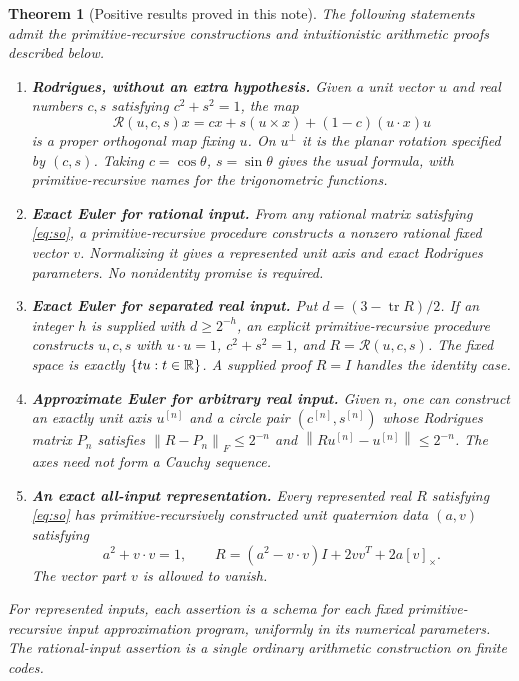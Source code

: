 \documentclass[11pt]{article}
\newtheorem{theorem}{Theorem}[section]
\theoremstyle{definition}\newtheorem{definition}[theorem]{Definition}
\newcommand{\tr}{\operatorname{tr}}\newcommand{\adj}{\operatorname{adj}}
\newcommand{\norm}[1]{\left\lVert#1\right\rVert}
\newcommand{\crossmat}[1]{[#1]_{\times}}
\begin{document}
\begin{theorem}[Positive results proved in this note]\label{thm:results}
The following statements admit the primitive-recursive constructions and
intuitionistic arithmetic proofs described below.
\begin{enumerate}[label=(\roman*)]
\item \textbf{Rodrigues, without an extra hypothesis.} Given a unit vector
$u$ and real numbers $c,s$ satisfying $c^2+s^2=1$, the map
\begin{equation}\label{eq:rodmain}
 \mathcal R(u,c,s)x=cx+s(u\times x)+(1-c)(u\cdot x)u
\end{equation}
is a proper orthogonal map fixing $u$. On $u^\perp$ it is the planar rotation
specified by $(c,s)$. Taking $c=\cos\theta$, $s=\sin\theta$ gives the usual
formula, with primitive-recursive names for the trigonometric functions.
\item \textbf{Exact Euler for rational input.} From any rational matrix
satisfying \eqref{eq:so}, a primitive-recursive procedure constructs a nonzero
rational fixed vector $v$. Normalizing it gives a represented unit axis and
exact Rodrigues parameters. No nonidentity promise is required.
\item \textbf{Exact Euler for separated real input.} Put
$d=(3-\tr R)/2$. If an integer $h$ is supplied with $d\ge2^{-h}$, an explicit
primitive-recursive procedure constructs $u,c,s$ with
$u\cdot u=1$, $c^2+s^2=1$, and $R=\mathcal R(u,c,s)$. The fixed space is
exactly $\{tu:t\in\mathbb R\}$. A supplied proof $R=I$ handles the identity case.
\item \textbf{Approximate Euler for arbitrary real input.} Given $n$, one can
construct an exactly unit axis $u^{[n]}$ and a circle pair $(c^{[n]},s^{[n]})$
whose Rodrigues matrix $P_n$ satisfies
$\norm{R-P_n}_F\le2^{-n}$ and
$\norm{Ru^{[n]}-u^{[n]}}\le2^{-n}$. The axes need not form a Cauchy sequence.
\item \textbf{An exact all-input representation.} Every represented real
$R$ satisfying \eqref{eq:so} has primitive-recursively constructed unit
quaternion data $(a,v)$ satisfying
\begin{equation}\label{eq:quaternion}
 a^2+v\cdot v=1,\qquad
 R=(a^2-v\cdot v)I+2vv^T+2a\crossmat v.
\end{equation}
The vector part $v$ is allowed to vanish.
\end{enumerate}
For represented inputs, each assertion is a schema for each fixed
primitive-recursive input approximation program, uniformly in its numerical
parameters. The rational-input assertion is a single ordinary arithmetic
construction on finite codes.
\end{theorem}
\end{document}
